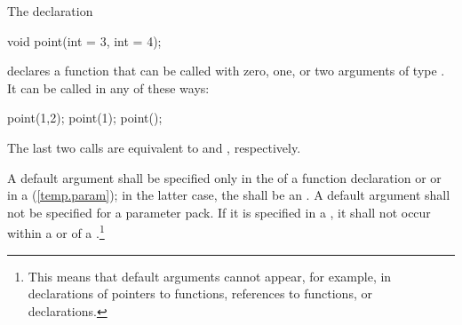 \pnum
{}%
\begin{example}
The declaration

\begin{codeblock}
void point(int = 3, int = 4);
\end{codeblock}

declares a function that can be called with zero, one, or two arguments of type
.
It can be called in any of these ways:

\begin{codeblock}
point(1,2);  point(1);  point();
\end{codeblock}

The last two calls are equivalent to
and
,
respectively.
\end{example}

\pnum
A default argument shall be specified only in the
of a function declaration
or 
or in a
(\ref{temp.param});
in the latter case, the  shall be an
.
A default argument shall not be specified for a parameter pack.
If it is specified in a
,
it shall not occur within a
or
of a
.\footnote{This means that default
arguments cannot appear,
for example, in declarations of pointers to functions,
references to functions, or
declarations.
}

